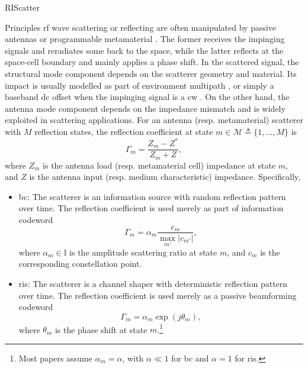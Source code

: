 \documentclass[journal]{IEEEtran}
\begin{document}
\begin{section}{RIScatter}
	\label{sc:riscatter}
	\begin{subsection}{Principles}
		\label{sc:principles}
		\gls{rf} wave scattering or reflecting are often manipulated by passive antennas or programmable metamaterial \cite{Liang2022}.
		The former receives the impinging signals and reradiates some back to the space, while the latter reflects at the space-cell boundary and mainly applies a phase shift.
		In the scattered signal, the structural mode component depends on the scatterer geometry and material.
		Its impact is usually modelled as part of environment multipath \cite{Thomas2012,Liang2020}, or simply a baseband \gls{dc} offset when the impinging signal is a \gls{cw} \cite{Boyer2014}.
		On the other hand, the antenna mode component depends on the impedance mismatch and is widely exploited in scattering applications.
		For an antenna (resp. metamaterial) scatterer with $M$ reflection states, the reflection coefficient at state $m \in \mathcal{M} \triangleq \{1,\ldots,M\}$ is \cite{VanHuynh2017,Liang2022}
		\begin{equation}
			\Gamma_m = \frac{Z_m - Z^*}{Z_m + Z},
			\label{eq:reflection_coefficient}
		\end{equation}
		where $Z_m$ is the antenna load (resp. metamaterial cell) impedance at state $m$, and $Z$ is the antenna input (resp. medium characteristic) impedance.
		Specifically,
		\begin{itemize}
			\item \gls{bc}: The scatterer is an information source with random reflection pattern over time.
			The reflection coefficient is used merely as part of information codeword \cite{Thomas2012a}
			\begin{equation}
				\Gamma_m = \alpha_m \frac{c_m}{\max_{m'} \lvert c_{m'} \rvert},
				\label{eq:backscatter_modulation}
			\end{equation}
			where $\alpha_m \in \mathbb{I}$ is the amplitude scattering ratio at state $m$, and $c_m$ is the corresponding constellation point.
			\item \gls{ris}: The scatterer is a channel shaper with deterministic reflection pattern over time.
			The reflection coefficient is used merely as a passive beamforming codeword \cite{Wu2018}
			\begin{equation}
				\Gamma_m = \alpha_m \exp(j \theta_m),
				\label{eq:passive_beamforming}
			\end{equation}
			where $\theta_m$ is the phase shift at state $m$.\footnote{Most papers assume $\alpha_m = \alpha$, with $\alpha \ll 1$ for \gls{bc} and $\alpha=1$ for \gls{ris}.\label{fn:scattering_ratio}}
		\end{itemize}


\end{subsection}
\end{section}
\end{document}
